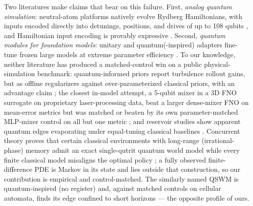 \documentclass{article}
\begin{document}
Two literatures make claims that bear on this failure. First, \emph{analog
quantum simulation}: neutral-atom platforms natively evolve Rydberg
Hamiltonians, with inputs encoded directly into detunings, positions, and
drives of up to 108 qubits \citep{kornjaca2024aquila}, and Hamiltonian input
encoding is provably expressive \citep{xia2026magicqrc}. Second,
\emph{quantum modules for foundation models}: unitary and quantum(-inspired)
adapters fine-tune frozen large models at extreme parameter efficiency
\citep{koikeakino2025quantumpeft,raj2025quic,aizpurua2026cayley,zhao2026mqadapter}.
To our knowledge, neither literature has produced a matched-control win
on a public physical-simulation benchmark: quantum-informed priors report turbulence rollout gains, but as offline regularizers against over-parameterized classical priors, with an advantage claim
\citep{wang2026qiml,xue2026qcml}; the closest in-model attempt, a 5-qubit
mixer in a 3D FNO surrogate on proprietary laser-processing data, beat a
larger dense-mixer FNO on mean-error metrics but was matched or beaten by
its own parameter-matched MLP-mixer control on all but one metric
\citep{papierz2026hqlpfno}; and reservoir studies show apparent quantum
edges evaporating under equal-tuning classical baselines
\citep{pandey2026qrcbaselines}. Concurrent theory proves that certain classical environments with
long-range (irrational-phase) memory admit an exact single-qutrit quantum
world model while every finite classical model misaligns the optimal policy
\citep{lumbreras2026irreducible}; a fully observed finite-difference PDE is
Markov in its state and lies outside that construction, so our contribution
is empirical and control-matched. The similarly named QSWM
\citep{sun2026qswm} is quantum-inspired (no register) and, against matched
controls on cellular automata, finds its edge confined to short horizons
--- the opposite profile of ours.
\end{document}
